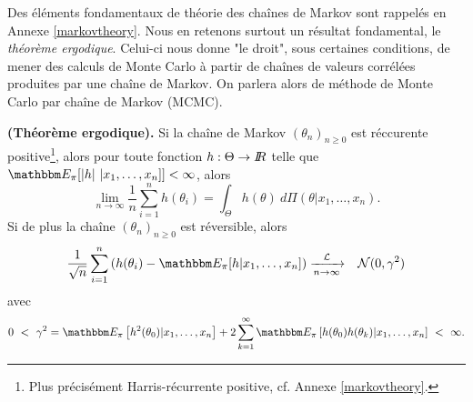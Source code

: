\noindent Des éléments fondamentaux de théorie des chaînes de Markov sont rappelés en Annexe \ref{markovtheory}. Nous en retenons surtout un résultat fondamental, le \emph{théorème ergodique}. Celui-ci nous donne "le droit", sous certaines conditions, de mener des calculs de Monte Carlo à partir de chaînes de valeurs corrélées produites par une chaîne de Markov. On parlera alors de méthode de Monte Carlo par chaîne de Markov (MCMC).  

\begin{theorem}{\bf (Théorème ergodique).}\label{theorem.ergogique}
Si la chaîne de Markov $(\theta_n)_{n\geq 0}$ est réccurente positive\footnote{Plus précisément Harris-récurrente positive, cf. Annexe \ref{markovtheory}.}, alors pour toute fonction $h:\Theta\to I\!\!R$ telle que $\E_{\pi}[|h| \ | x_1,\ldots,x_n] ]<\infty$, alors
$$
\lim\limits_{n\to\infty} \frac{1}{n} \sum\limits_{i=1}^n h(\theta_i)  =  \int_{\Theta} h(\theta) \ d\Pi(\theta|x_1,\ldots,x_n).
$$
Si de plus la chaîne $(\theta_n)_{n\geq 0}$ est réversible, alors 
\begin{eqnarray*}
\frac{1}{\sqrt{n}} \sum\limits_{i=1}^n \left(h(\theta_i)-\E_{\pi}[h  | x_1,\ldots,x_n] \right) & \xrightarrow[n\to\infty]{{\cal{L}}} & {\cal{N}}(0,\gamma^2)
\end{eqnarray*}
avec
$$
0 \ < \ \gamma^2 = \E_{\pi}\left[h^2(\theta_0)  | x_1,\ldots,x_n\right] + 2 \sum\limits_{k=1}^{\infty} \E_{\pi}\left[h(\theta_0) h(\theta_k)  | x_1,\ldots,x_n\right] \ < \ \infty.
$$
\end{theorem}


